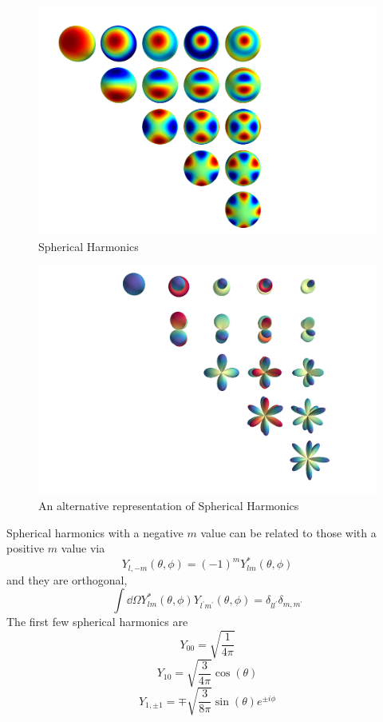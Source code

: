 \begin{figure}
  \centering
  \includegraphics[width=\textwidth]{figures/spharmonics.png}
  \caption{Spherical Harmonics}
  \label{fig:spharmonics}
\end{figure}

\begin{figure}
  \centering
  \includegraphics[width=\textwidth]{figures/spharmonics2.png}
  \caption{An alternative representation of Spherical Harmonics}
  \label{fig:spharmonics}
\end{figure}

Spherical harmonics with a negative $m$ value can be related to those
with a positive $m$ value via
\begin{equation}
  \label{eq:negativespharm}
  Y_{l, -m} (\theta, \phi) = (-1)^m Y^{*}_{lm} (\theta, \phi)
\end{equation}
and they are orthogonal,
\begin{equation}
  \label{eq:spahrmorthog}
  \int \dd{\Omega} Y^{*}_{lm} (\theta, \phi) Y_{l^{\prime}m^{\prime}}(\theta, \phi) = \delta_{l l^{\prime}} \delta_{m, m^{\prime}}
\end{equation}
The first few spherical harmonics are
\[ Y_{00} = \sqrt{\frac{1}{4 \pi}} \]
\[ Y_{10}= \sqrt{\frac{3}{4 \pi}} \cos(\theta) \]
\[ Y_{1, \pm 1} = \mp \sqrt{\frac{3}{8 \pi}} \sin(\theta) e^{\pm i \phi} \]

